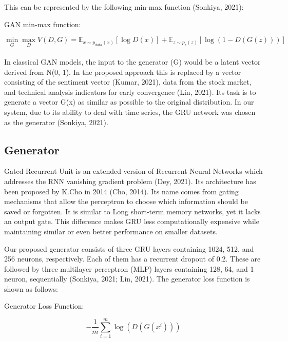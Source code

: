 \documentclass[review]{elsarticle} %
\begin{document}
\pagebreak
\noindent This can be represented by the following min-max function (Sonkiya, 2021): 


\begin{center}   GAN min-max function: \end{center}
\begin{equation} \min_G \max_D V(D, G)=
\mathbb{E}_{x\sim p_{data}(x)}[\log D(x)]
+ \mathbb{E}_{z\sim p_z(z)}[\log(1 - D(G(z)))] \end{equation}\\

In classical GAN models, the input to the generator (G) would be a latent vector derived from N(0, 1). In the proposed approach this is replaced by a vector consisting of the sentiment vector (Kumar, 2021), data from the stock market, and technical analysis indicators for early convergence (Lin, 2021). Its task is to generate a vector G(x) as similar as possible to the original distribution. In our system, due to its ability to deal with time series, the GRU network was chosen as the generator (Sonkiya, 2021). 


\subsection{Generator}

Gated Recurrent Unit is an extended version of Recurrent Neural Networks which addresses the RNN vanishing gradient problem (Dey, 2021).
Its architecture has been proposed by K.Cho in 2014 (Cho, 2014). Its name comes from gating mechanisms that allow the perceptron to choose which information should be saved or forgotten. It is similar to Long short-term memory networks, yet it lacks an output gate. This difference makes GRU less computationally expensive while maintaining similar or even better performance on smaller datasets. 

Our proposed generator consists of three GRU layers containing 1024, 512, and 256 neurons, respectively. Each of them has a recurrent dropout of 0.2. These are followed by three multilayer perceptron (MLP) layers containing 128, 64, and 1 neuron, sequentially (Sonkiya, 2021; Lin, 2021). 
The generator loss function is shown as follows: 

\begin{center}   Generator Loss Function:  \end{center}
\begin{equation}
-\frac{1}{m} \sum_{i=1}^{m} \log \left(D\left(G\left(x^{i}\right)\right)\right)
\end{equation}\\
\end{document}
